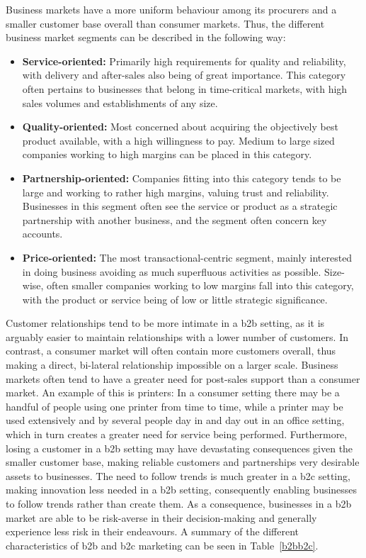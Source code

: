 \newpage
Business markets have a more uniform behaviour among its procurers and a smaller customer base overall than consumer markets. Thus, the different business market segments can be described in the following way:
\begin{itemize}
    \item \textbf{Service-oriented: }Primarily high requirements for quality and reliability, with delivery and after-sales also being of great importance. This category often pertains to businesses that belong in time-critical markets, with high sales volumes and establishments of any size.
    \item \textbf{Quality-oriented: }Most concerned about acquiring the objectively best product available, with a high willingness to pay. Medium to large sized companies working to high margins can be placed in this category.
    \item \textbf{Partnership-oriented: }Companies fitting into this category tends to be large and working to rather high margins, valuing trust and reliability. Businesses in this segment often see the service or product as a strategic partnership with another business, and the segment often concern key accounts.
    \item \textbf{Price-oriented: }The most transactional-centric segment, mainly interested in doing business avoiding as much superfluous activities as possible. Size-wise, often smaller companies working to low margins fall into this category, with the product or service being of low or little strategic significance.
\end{itemize}


Customer relationships tend to be more intimate in a \gls{b2b} setting, as it is arguably easier to maintain relationships with a lower number of customers. In contrast, a consumer market will often contain more customers overall, thus making a direct, bi-lateral relationship impossible on a larger scale. Business markets often tend to have a greater need for post-sales support than a consumer market. An example of this is printers: In a consumer setting there may be a handful of people using one printer from time to time, while a printer may be used extensively and by several people day in and day out in an office setting, which in turn creates a greater need for service being performed. Furthermore, losing a customer in a \gls{b2b} setting may have devastating consequences given the smaller customer base, making reliable customers and partnerships very desirable assets to businesses. The need to follow trends is much greater in a \gls{b2c} setting, making innovation less needed in a \gls{b2b} setting, consequently enabling businesses to follow trends rather than create them. As a consequence, businesses in a \gls{b2b} market are able to be risk-averse in their decision-making and generally experience less risk in their endeavours. A summary of the different characteristics of \gls{b2b} and \gls{b2c} marketing can be seen in Table~\ref{b2bb2c}.


